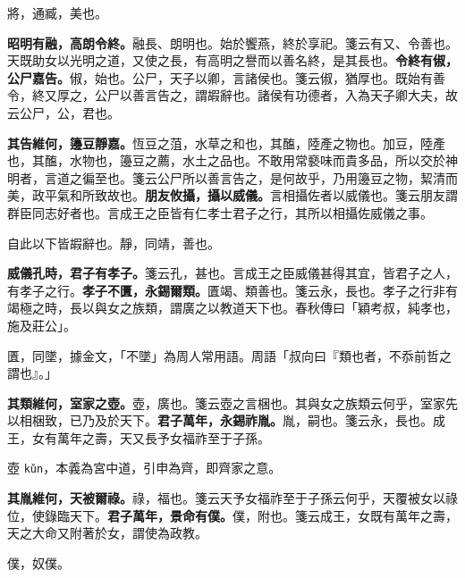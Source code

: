 \begin{quoting}將，通臧，美也。\end{quoting}

\textbf{昭明有融，高朗令終。}{\footnotesize 融長、朗明也。始於饗燕，終於享祀。箋云有又、令善也。天既助女以光明之道，又使之長，有高明之譽而以善名終，是其長也。}\textbf{令終有俶，公尸嘉告。}{\footnotesize 俶，始也。公尸，天子以卿，言諸侯也。箋云俶，猶厚也。既始有善令，終又厚之，公尸以善言告之，謂嘏辭也。諸侯有功德者，入為天子卿大夫，故云公尸，公，君也。}

\textbf{其告維何，籩豆靜嘉。}{\footnotesize 恆豆之菹，水草之和也，其醢，陸產之物也。加豆，陸產也，其醢，水物也，籩豆之薦，水土之品也。不敢用常褻味而貴多品，所以交於神明者，言道之徧至也。箋云公尸所以善言告之，是何故乎，乃用籩豆之物，絜清而美，政平氣和所致故也。}\textbf{朋友攸攝，攝以威儀。}{\footnotesize 言相攝佐者以威儀也。箋云朋友謂群臣同志好者也。言成王之臣皆有仁孝士君子之行，其所以相攝佐威儀之事。}

\begin{quoting}自此以下皆嘏辭也。靜，同靖，善也。\end{quoting}

\textbf{威儀孔時，君子有孝子。}{\footnotesize 箋云孔，甚也。言成王之臣威儀甚得其宜，皆君子之人，有孝子之行。}\textbf{孝子不匱，永錫爾類。}{\footnotesize 匱竭、類善也。箋云永，長也。孝子之行非有竭極之時，長以與女之族類，謂廣之以教道天下也。春秋傳曰「穎考叔，純孝也，施及莊公」。}

\begin{quoting}匱，同墜，據金文，「不墜」為周人常用語。周語「叔向曰『類也者，不忝前哲之謂也』。」\end{quoting}

\textbf{其類維何，室家之壺。}{\footnotesize 壺，廣也。箋云壺之言梱也。其與女之族類云何乎，室家先以相梱致，已乃及於天下。}\textbf{君子萬年，永錫祚胤。}{\footnotesize 胤，嗣也。箋云永，長也。成王，女有萬年之壽，天又長予女福祚至于子孫。}

\begin{quoting}壺 \texttt{kǔn}，本義為宮中道，引申為齊，即齊家之意。\end{quoting}

\textbf{其胤維何，天被爾祿。}{\footnotesize 祿，福也。箋云天予女福祚至于子孫云何乎，天覆被女以祿位，使錄臨天下。}\textbf{君子萬年，景命有僕。}{\footnotesize 僕，附也。箋云成王，女既有萬年之壽，天之大命又附著於女，謂使為政教。}

\begin{quoting}僕，奴僕。\end{quoting}

